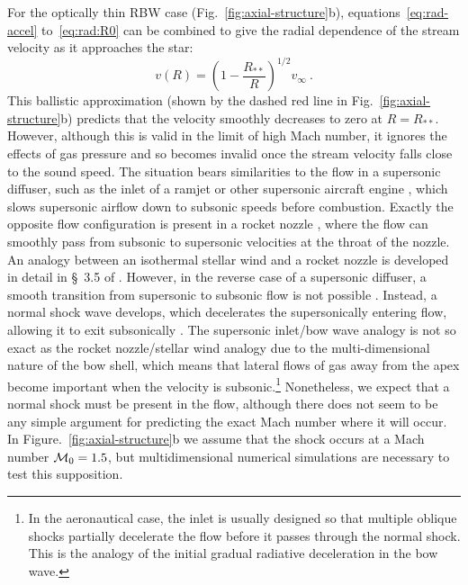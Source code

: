 For the optically thin RBW case (Fig.~\ref{fig:axial-structure}b),
equations~\eqref{eq:rad-accel} to~\eqref{eq:rad:R0} can be combined to
give the radial dependence of the stream velocity as it approaches the
star:
\begin{equation}
  \label{eq:v-RBW-ballistic}
  v(R) = \left( 1 - \frac{R_{**}}{R} \right)^{1/2} v_\infty \ .
\end{equation}
This ballistic approximation (shown by the dashed red line in
Fig.~\ref{fig:axial-structure}b) predicts that the velocity smoothly
decreases to zero at \(R = R_{**}\).  However, although this is valid
in the limit of high Mach number, it ignores the effects of gas
pressure and so becomes invalid once the stream velocity falls close
to the sound speed.  The situation bears similarities to the flow in a
supersonic diffuser, such as the inlet of a ramjet or other supersonic
aircraft engine \citep{Seddon:1999a}, which slows supersonic airflow
down to subsonic speeds before combustion.  Exactly the opposite flow
configuration is present in a rocket nozzle \citep{Courant:1948a},
where the flow can smoothly pass from subsonic to supersonic
velocities at the throat of the nozzle.  An analogy between an
isothermal stellar wind and a rocket nozzle is developed in detail in
\S~3.5 of \citet{Lamers:1999b}.  However, in the reverse case of a
supersonic diffuser, a smooth transition from supersonic to subsonic
flow is not possible \citep{Morawetz:1956a}.  Instead, a normal shock
wave develops, which decelerates the supersonically entering flow,
allowing it to exit subsonically \citep{Embid:1984a, Hafez:1999a}.
The supersonic inlet/bow wave analogy is not so exact as the rocket
nozzle/stellar wind analogy due to the multi-dimensional nature of the
bow shell, which means that lateral flows of gas away from the apex
become important when the velocity is subsonic.\footnote{%
  In the aeronautical case, the inlet is usually designed so that
  multiple oblique shocks partially decelerate the flow before it
  passes through the normal shock.  This is the analogy of the initial
  gradual radiative deceleration in the bow wave.  } %
Nonetheless, we expect that a normal shock must be present in the
flow, although there does not seem to be any simple argument for
predicting the exact Mach number where it will occur.  In
Figure.~\ref{fig:axial-structure}b we assume that the shock occurs at
a Mach number \(\mathcal{M}_0 = 1.5\), but multidimensional numerical
simulations are necessary to test this supposition.

